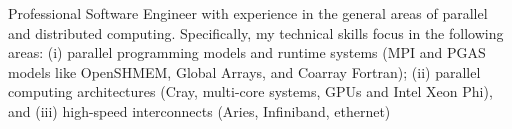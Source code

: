 Professional Software Engineer with experience in the general areas of parallel
and distributed computing. Specifically, my technical skills focus in the
following areas:
(i)   parallel programming models and runtime systems (MPI and PGAS models like
      OpenSHMEM, Global Arrays, and Coarray Fortran);
(ii)  parallel computing architectures (Cray, multi-core systems, GPUs and Intel
      Xeon Phi), and
(iii) high-speed interconnects (Aries, Infiniband, ethernet)

